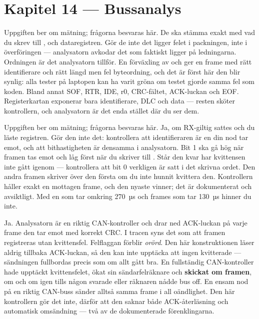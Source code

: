 \section*{Kapitel 14 --- Bussanalys}

Uppgiften ber om mätning; frågorna besvaras här.
 De ska stämma exakt med vad du skrev till ,  och dataregistren.
Gör de inte det ligger felet i packningen, inte i överföringen --- analysatorn avkodar det som
faktiskt ligger på ledningarna.
 Ordningen är det analysatorn tillför. En förväxling av  och
 ger en frame med rätt identifierare och rätt längd men fel byteordning, och det
är först här den blir synlig: alla tester på laptopen kan ha varit gröna om testet gjorde samma
fel som koden.
 Bland annat SOF, RTR, IDE, r0, CRC-fältet, ACK-luckan och EOF. Registerkartan exponerar
bara identifierare, DLC och data --- resten sköter kontrollern, och analysatorn är det enda stället
där du ser dem.

Uppgiften ber om mätning; frågorna besvaras här.
 Ja, om RX-giltig sattes och du läste registren. Gör den inte det: kontrollera att
identifieraren är en din nod tar emot, och att bithastigheten är densamma i analysatorn.
 Bit 1 ska gå hög när framen tas emot och låg först när du skriver  till
. Står den kvar har kvittensen inte gått igenom --- kontrollera att bit 0 verkligen är
satt i det skrivna ordet.
 Den andra framen skriver över den första om du inte hunnit kvittera den. Kontrollern
håller exakt en mottagen frame, och den nyaste vinner; det är dokumenterat och avsiktligt. Med en
 som tar omkring 270~µs och frames som tar 130~µs hinner du inte.

 Ja. Analysatorn är en riktig CAN-kontroller och drar ned ACK-luckan på varje frame den tar
emot med korrekt CRC. I tracen syns det som att framen registreras utan kvittensfel.
 Felflaggan förblir \emph{orörd}. Den här konstruktionen läser aldrig tillbaka ACK-luckan,
så den kan inte upptäcka att ingen kvitterade --- sändningen fullbordas precis som om allt gått
bra.
 En fullständig CAN-kontroller hade upptäckt kvittensfelet, ökat sin sändarfelräknare och
\textbf{skickat om framen}, om och om igen tills någon svarade eller räknaren nådde bus off. En
ensam nod på en riktig CAN-buss sänder alltså samma frame i all oändlighet. Den här kontrollern
gör det inte, därför att den saknar både ACK-återläsning och automatisk omsändning --- två av de
dokumenterade förenklingarna.

